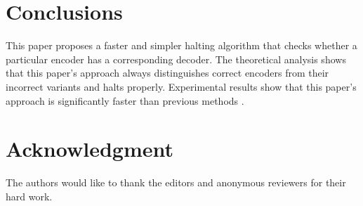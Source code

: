 \documentclass[journal]{IEEEtran}
\begin{document}
{%

\section{Conclusions}\label{sec_conclude}

This paper proposes a faster and simpler halting algorithm that checks whether a particular encoder has a corresponding decoder.
The theoretical analysis shows that this paper's approach always distinguishes correct encoders from their incorrect variants and halts properly.
Experimental results show that this paper's approach is significantly faster than previous methods \cite{ShengYuShen:fmcad10}.



\section*{Acknowledgment}
The authors would like to thank the editors and anonymous reviewers for their hard work.

%
%



}
\end{document}
